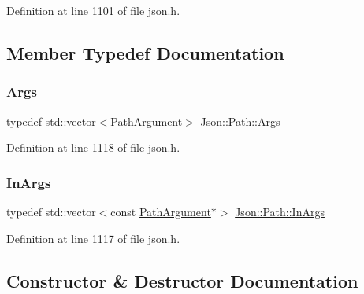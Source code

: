 Definition at line 1101 of file json.\+h.



\subsection{Member Typedef Documentation}
\mbox{\label{class_json_1_1_path_a27d96232d034d7a78286468676f9cb3e}} 
\subsubsection{\texorpdfstring{Args}{Args}}
{\footnotesize\ttfamily typedef std\+::vector$<$\hyperlink{class_json_1_1_path_argument}{Path\+Argument}$>$ \hyperlink{class_json_1_1_path_a27d96232d034d7a78286468676f9cb3e}{Json\+::\+Path\+::\+Args}\hspace{0.3cm}{\ttfamily [private]}}



Definition at line 1118 of file json.\+h.

\mbox{\label{class_json_1_1_path_ab29d7b2fc896c7d3c5ed4609af3a3f23}} 
\subsubsection{\texorpdfstring{In\+Args}{InArgs}}
{\footnotesize\ttfamily typedef std\+::vector$<$const \hyperlink{class_json_1_1_path_argument}{Path\+Argument}$\ast$$>$ \hyperlink{class_json_1_1_path_ab29d7b2fc896c7d3c5ed4609af3a3f23}{Json\+::\+Path\+::\+In\+Args}\hspace{0.3cm}{\ttfamily [private]}}



Definition at line 1117 of file json.\+h.



\subsection{Constructor \& Destructor Documentation}
\mbox{\label{class_json_1_1_path_a7356c0e9c1fc2276390fd396271c1300}} 
